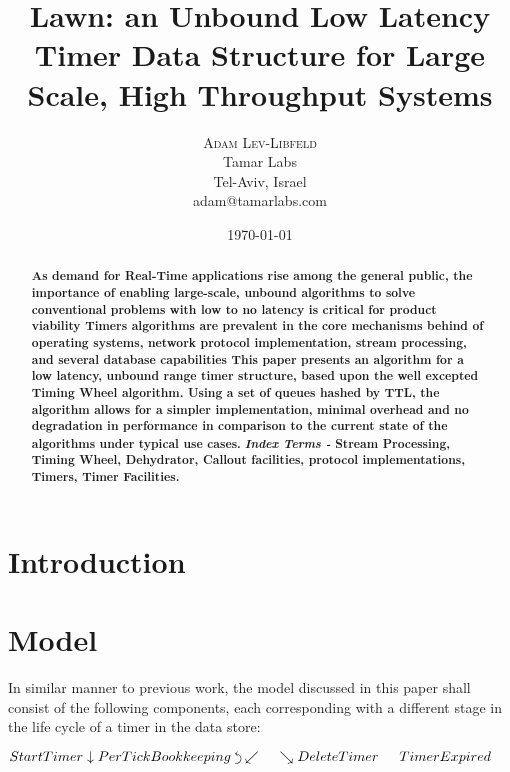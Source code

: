 \documentclass[twocolumn,a4paper]{article}
\title{Lawn: an Unbound Low Latency Timer Data Structure for Large Scale, High Throughput Systems}
\author{
	\textsc{Adam Lev-Libfeld} \\[1ex]
	\normalsize Tamar Labs \\
	\normalsize Tel-Aviv, Israel \\
	\normalsize{adam@tamarlabs.com}
}
\date{\today}
\newcommand{\backtrackarrow}{\rotatebox[origin=c]{-90}{$\curvearrowleft$}}
\begin{document}
\maketitle

\begin{abstract}
\textbf{\noindent As demand for Real-Time applications rise among the general public, the importance of enabling large-scale, unbound algorithms to solve conventional problems with low to no latency is critical for product viability Timers algorithms are prevalent in the core mechanisms behind of operating systems, network protocol implementation, stream processing, and several database capabilities This paper presents an algorithm for a low latency, unbound range timer structure, based upon the well excepted Timing Wheel algorithm. Using a set of queues hashed by TTL, the algorithm allows for a simpler implementation, minimal overhead and no degradation in performance in comparison to the current state of the algorithms under typical use cases.}
\linebreak \linebreak
\textbf{\textit{Index Terms -} Stream Processing, Timing Wheel, Dehydrator, Callout facilities, protocol implementations, Timers, Timer Facilities.}
\end{abstract}


\section{Introduction}

\section{Model}
In similar manner to previous work\cite{TW}, the model discussed in this paper shall consist of the following components, each corresponding with a different stage in the life cycle of a timer in the data store:
\begin{center}
	$
	StartTimer \linebreak 
	\downarrow \linebreak  
	PerTickBookkeeping \hspace{1mm} \backtrackarrow \linebreak 
	\swarrow  \hspace{15pt}  \searrow \linebreak 
	DeleteTimer \hspace{15pt} TimerExpired
	$
	\vspace{3pt}
\end{center}
\end{document}
